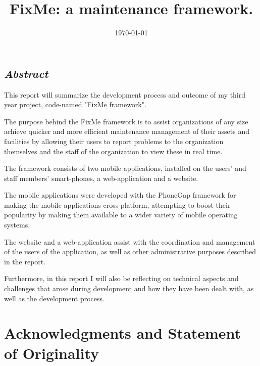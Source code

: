 \documentclass[12pt]{ecsproject}     %
\begin{document}
\frontmatter
\addresses{\goupname \\ \deptname \\ \univname}
\date{\today}
\title{FixMe: a maintenance framework.}



\maketitle

\section*{\textit{Abstract}}
This report will summarize the development process and outcome of my third year project, code-named "FixMe framework".

The purpose behind the FixMe framework is to assist organizations of any size achieve quicker and more efficient maintenance management of their assets and facilities by allowing their users to report problems to the organization themselves and the staff of the organization to view these in real time.

The framework consists of two mobile applications, installed on the users' and staff members' smart-phones, a web-application and a website.

The mobile applications were developed with the PhoneGap framework for making the mobile applications cross-platform, attempting to boost their popularity by making them available to a wider variety of mobile operating systems.

The website and a web-application assist with the coordination and management of the users of the application, as well as other administrative purposes described in the report.

Furthermore, in this report I will also be reflecting on technical aspects and challenges that arose during development and how they have been dealt with, as well as the development process.

\tableofcontents


\chapter*{Acknowledgments and Statement of Originality }
\end{document}
